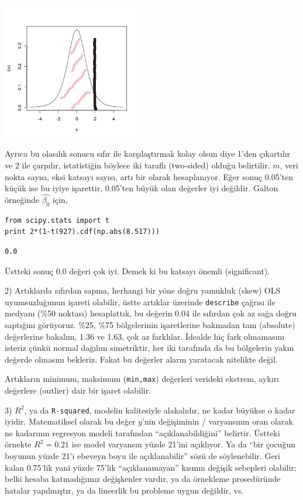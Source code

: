 \documentclass[12pt,fleqn]{article}\usepackage{../../common}
\begin{document}
\includegraphics[height=6cm]{stat_linreg_03.png}

Ayrıca bu olasılık sonucu sıfır ile karşılaştırmak kolay olsun diye 1'den
çıkartılır ve 2 ile çarpılır, istatistiğin böylece iki taraflı (two-sided)
olduğu belirtilir. $m$, veri nokta sayısı, eksi katsayı sayısı, artı bir olarak
hesaplanıyor. Eğer sonuç 0.05'ten küçük ise bu iyiye işarettir, 0.05'ten büyük
olan değerler iyi değildir. Galton örneğinde $\hat{\beta_0}$ için,

\begin{verbatim}
from scipy.stats import t
print 2*(1-t(927).cdf(np.abs(8.517)))
\end{verbatim}

\begin{verbatim}
0.0
\end{verbatim}

Üstteki sonuç 0.0 değeri çok iyi. Demek ki bu katsayı önemli (significant).

2) Artıklarda sıfırdan sapma, herhangi bir yöne doğru yamukluk (skew) OLS
uyumsuzluğunun işareti olabilir, üstte artıklar üzerinde \verb!describe!
çağrısı ile medyanı (\%50 noktası) hesaplattık, bu değerin 0.04 ile sıfırdan
çok az sağa doğru saptığını görüyoruz. \%25, \%75 bölgelerinin işaretlerine
bakmadan tam (absolute) değerlerine bakalım, 1.36 ve 1.63, çok az
farklılar. İdealde hiç fark olmamasını isteriz çünkü normal dağılım
simetriktir, her iki tarafında da bu bölgelerin yakın değerde olmasını
bekleriz. Fakat bu değerler alarm yaratacak nitelikte değil.

Artıkların minimum, maksimum (\verb!min,max!) değerleri verideki ekstrem, aykırı
değerlere (outlier) dair bir işaret olabilir.

3) $R^2$, ya da \verb!R-squared!, modelin kalitesiyle alakalıdır, ne kadar
büyükse o kadar iyidir. Matematiksel olarak bu değer $y$'nin değişiminin /
varyansının oran olarak ne kadarının regresyon modeli tarafından
``açıklanabildiğini'' belirtir. Üstteki örnekte $R^2=0.21$ ise model varyansın
yüzde 21'ini açıklıyor. Ya da ``bir çocuğun boyunun yüzde 21'i ebeveyn boyu ile
açıklanabilir'' sözü de söylenebilir. Geri kalan 0.75'lik yani yüzde 75'lik
``açıklanamayan'' kısmın değişik sebepleri olabilir; belki hesaba katmadığımız
değişkenler vardır, ya da örnekleme prosedüründe hatalar yapılmıştır, ya da
lineerlik bu probleme uygun değildir, vs.
\end{document}
